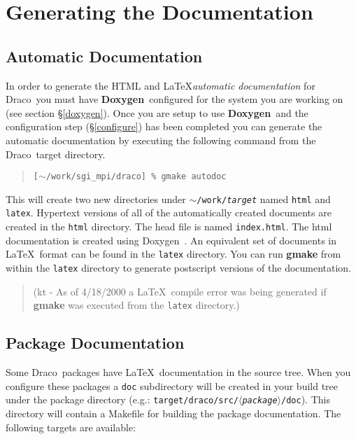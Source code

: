 \documentclass[11pt]{nmemo}
\newcommand{\comp}[1]{\normalfont\normalsize\texttt{#1}}
\newcommand{\draco}{{\normalfont\sffamily Draco}}
\newcommand{\doxygen}{{\normalfont\bfseries Doxygen}}
\begin{document}

\section{Generating the Documentation}

\subsection{Automatic Documentation}

In order to generate the HTML and \LaTeX \emph{automatic documentation} for
\draco\ you must have \doxygen\ configured for the system you are
working on (see section \S\ref{doxygen}).  Once you are setup to use
\doxygen\ and the configuration step (\S\ref{configure}) has been
completed you can generate the automatic documentation by executing the
following command from the \draco\ target directory.

\begin{verse}
\texttt{[$\sim$/work/sgi\_mpi/draco] \% gmake autodoc}
\end{verse}

This will create two new directories under
\comp{$\sim$/work/\emph{target}} named \comp{html} and \comp{latex}.
Hypertext versions of all of the automatically created documents are
created in the \comp{html} directory.  The head file is named
\comp{index.html}.  The html documentation is created using
Doxygen~\cite{doxygen}.  An equivalent set of documents in \LaTeX\ 
format can be found in the \comp{latex} directory.  You can run
\textbf{gmake} from within the \comp{latex} directory to generate
postscript versions of the documentation.  

\begin{verse}
(kt - As of 4/18/2000 a \LaTeX\ compile error was being generated if
\textbf{gmake} was executed from the \comp{latex} directory.)
\end{verse}

\subsection{Package Documentation}

Some \draco\ packages have \LaTeX\ documentation in the source tree.
When you configure these packages a \comp{doc} subdirectory will be
created in your build tree under the package directory (e.g.:
\comp{target/draco/src/$\langle$\emph{package}$\rangle$/doc}).  This directory will
contain a Makefile for building the package documentation.  The
following targets are available:
\end{document}
